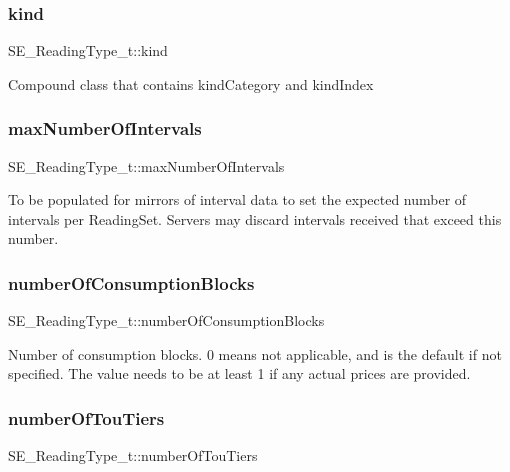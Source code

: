 \subsubsection{\texorpdfstring{kind}{kind}}
{\footnotesize\ttfamily S\+E\+\_\+\+Reading\+Type\+\_\+t\+::kind}

Compound class that contains kind\+Category and kind\+Index \mbox{\label{group__ReadingType_ga2d016202de3cc2404cf2065adeaeb4f7}} 
\subsubsection{\texorpdfstring{max\+Number\+Of\+Intervals}{maxNumberOfIntervals}}
{\footnotesize\ttfamily S\+E\+\_\+\+Reading\+Type\+\_\+t\+::max\+Number\+Of\+Intervals}

To be populated for mirrors of interval data to set the expected number of intervals per Reading\+Set. Servers may discard intervals received that exceed this number. \mbox{\label{group__ReadingType_gaf04b33d882d8c1fc9a5234d3a2a7f01b}} 
\subsubsection{\texorpdfstring{number\+Of\+Consumption\+Blocks}{numberOfConsumptionBlocks}}
{\footnotesize\ttfamily S\+E\+\_\+\+Reading\+Type\+\_\+t\+::number\+Of\+Consumption\+Blocks}

Number of consumption blocks. 0 means not applicable, and is the default if not specified. The value needs to be at least 1 if any actual prices are provided. \mbox{\label{group__ReadingType_ga815c888ead50b860c86080e455b1bb2b}} 
\subsubsection{\texorpdfstring{number\+Of\+Tou\+Tiers}{numberOfTouTiers}}
{\footnotesize\ttfamily S\+E\+\_\+\+Reading\+Type\+\_\+t\+::number\+Of\+Tou\+Tiers}


